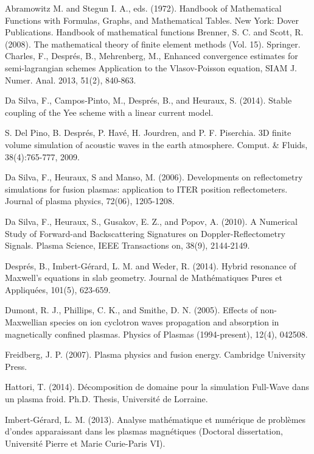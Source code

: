 \documentclass[proc]{edpsmath}
\begin{document}
\begin{thebibliography}{99}
	 Abramowitz M. and Stegun I. A., eds. (1972). Handbook of Mathematical Functions with Formulas, Graphs, and Mathematical Tables. New York: Dover Publications.
	Handbook of mathematical functions
	 Brenner, S. C. and Scott, R. (2008). The mathematical theory of finite element methods (Vol. 15). Springer.
Charles, F., Despr\'es, B., Mehrenberg, M., 
Enhanced convergence estimates for semi-lagrangian schemes Application to the Vlasov-Poisson equation, SIAM J. Numer. Anal. 2013, 51(2), 840-863.

 Da Silva, F., Campos-Pinto, M., Després, B., and Heuraux, S. (2014). Stable coupling of the Yee scheme with a linear current model.

S. Del Pino, B. Despr\'es, P. Hav\'e, H. Jourdren, and P. F. Piserchia. 3D finite
volume simulation of acoustic waves in the earth atmosphere.
Comput. \&
Fluids, 38(4):765-777, 2009.

 Da Silva, F., Heuraux, S and  Manso, M. (2006). Developments on reflectometry simulations for fusion plasmas: application to ITER position reflectometers. Journal of plasma physics, 72(06), 1205-1208.

Da Silva, F., Heuraux, S., Gusakov, E. Z., and Popov, A. (2010). A Numerical Study of Forward-and Backscattering Signatures on Doppler-Reflectometry Signals. Plasma Science, IEEE Transactions on, 38(9), 2144-2149.

 Després, B., Imbert-Gérard, L. M. and Weder, R. (2014). Hybrid resonance of Maxwell's equations in slab geometry. Journal de Mathématiques Pures et Appliquées, 101(5), 623-659.

 Dumont, R. J., Phillips, C. K., and Smithe, D. N. (2005). Effects of non-Maxwellian species on ion cyclotron waves propagation and absorption in magnetically confined plasmas. Physics of Plasmas (1994-present), 12(4), 042508.

 Freidberg, J. P. (2007). Plasma physics and fusion energy. Cambridge University Press.


Hattori, T. (2014).
D\'ecomposition de domaine pour la simulation Full-Wave dans un plasma froid.
Ph.D. Thesis, Universit\'e de
Lorraine.

 Imbert-Gérard, L. M. (2013). Analyse mathématique et numérique de problèmes d'ondes apparaissant dans les plasmas magnétiques (Doctoral dissertation, Université Pierre et Marie Curie-Paris VI).





\end{thebibliography}
\end{document}

